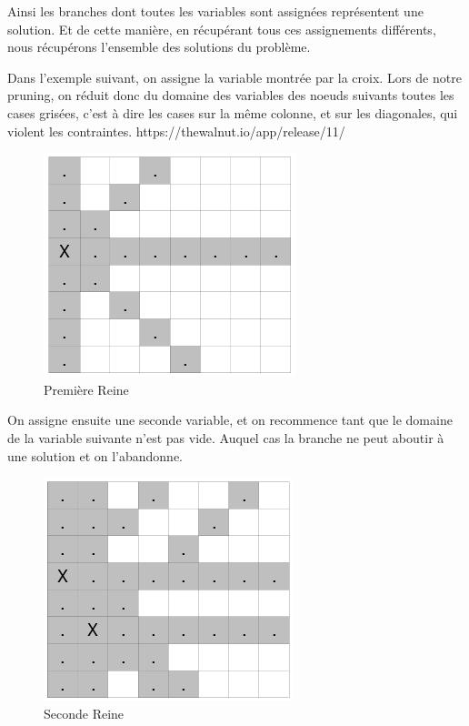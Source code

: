 \documentclass{article}
\begin{document}
Ainsi les branches dont toutes les variables sont assignées représentent une solution. Et de cette manière, en récupérant tous ces assignements différents, nous récupérons l'ensemble des solutions du problème. 

\clearpage

Dans l'exemple suivant, on assigne la variable montrée par la croix. Lors de notre pruning, on réduit donc du domaine des variables des noeuds suivants toutes les cases grisées, c'est à dire les cases sur la même colonne, et sur les diagonales, qui violent les contraintes. 
https://thewalnut.io/app/release/11/ 
\begin{figure}[h]
\caption{\label{reine1} Première Reine}
\begin{center}
\includegraphics[scale=0.5]{./picture/pruning1.png}
\end{center}
\end{figure}

On assigne ensuite une seconde variable, et on recommence tant que le domaine de la variable suivante n'est pas vide. Auquel cas la branche ne peut aboutir à une solution et on l'abandonne.

\begin{figure}[h]
\caption{\label{reine2} Seconde Reine}
\begin{center}
\includegraphics[scale=0.5]{./picture/pruning2.png}
\end{center}
\end{figure}
\end{document}
